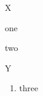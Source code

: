 \documentclass{article}
\begin{document}
X \begin{enumerate*}\item one \item two\end{enumerate*} Y
\begin{enumerate}\item three\end{enumerate}
\end{document}
